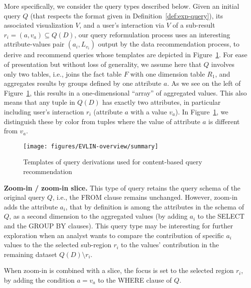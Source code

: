   
More specifically, we consider the query types described below. 
Given an initial query $Q$ (that respects the format given in Definition~\ref{def:exp-query}), its associated visualization $V$, and a user's interaction via $V$ of a sub-result $r_i = (a, v_a) \subseteq Q(D)$, our query reformulation process uses  an interesting attribute-values pair $\left(a_{i},L_{v_{i}}\right)$ output by the data recommendation process, to derive and recommend queries whose templates are depicted in Figure~\ref{fig:QueryDER}.
 For ease of presentation but without loss of generality, we assume here that $Q$ involves only two tables, i.e., joins the fact table $F$ with one dimension table $R_1$, and aggregates results by groups defined by one attribute $a$. As we see on the left of Figure~\ref{fig:QueryDER}, this results in a one-dimensional ``array'' of aggregated values.  This also means that any tuple in $Q(D)$ has exactly two attributes, in particular including user's interaction $r_i$ (attribute $a$ with a value $v_a$). %
In Figure~\ref{fig:QueryDER}, we distinguish these by color from tuples where the value of attribute $a$ is different from $v_a$. 


\begin{figure}[t]
\centering
\texttt{[image: figures/EVLIN-overview/summary]}
\caption{Templates of query derivations used for content-based query recommendation}
\label{fig:QueryDER}
\end{figure}



\noindent \textbf{Zoom-in / zoom-in slice.} This type of query retains the query schema of the original query $Q$, i.e., the FROM clause remains unchanged. However, zoom-in adds the attribute $a_i$, that by definition is among the attributes in the schema of $Q$,  as a second dimension to the aggregated values (by adding $a_i$ to the SELECT and the GROUP BY clauses). This query type may be interesting for further exploration when an analyst wants to compare the contribution of specific $a_i$ values to the the selected sub-region $r_i$ to the values' contribution in the remaining dataset $Q(D) \setminus r_i$. 

When zoom-in is combined with a slice, the focus is set to the selected region $r_i$, by adding the condition $a = v_a$ to the WHERE clause of $Q$. 



